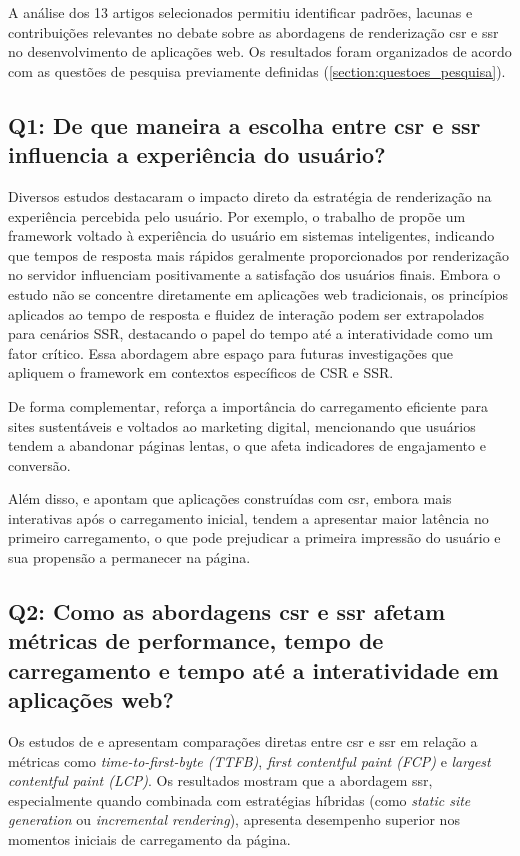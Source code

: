 A análise dos 13 artigos selecionados permitiu identificar padrões, lacunas e contribuições relevantes no debate sobre as abordagens de renderização \acrshort{csr} e \acrshort{ssr} no desenvolvimento de aplicações web. Os resultados foram organizados de acordo com as questões de pesquisa previamente definidas (\autoref{section:questoes_pesquisa}).

\subsection{Q1: De que maneira a escolha entre \acrshort{csr} e \acrshort{ssr} influencia a experiência do usuário?}

Diversos estudos destacaram o impacto direto da estratégia de renderização na experiência percebida pelo usuário. Por exemplo, o trabalho de \cite{Zhou2022} propõe um framework voltado à experiência do usuário em sistemas inteligentes, indicando que tempos de resposta mais rápidos geralmente proporcionados por renderização no servidor influenciam positivamente a satisfação dos usuários finais. Embora o estudo não se concentre diretamente em aplicações web tradicionais, os princípios aplicados ao tempo de resposta e fluidez de interação podem ser extrapolados para cenários SSR, destacando o papel do tempo até a interatividade como um fator crítico. Essa abordagem abre espaço para futuras investigações que apliquem o framework em contextos específicos de CSR e SSR.

De forma complementar, \cite{Lacom2022} reforça a importância do carregamento eficiente para sites sustentáveis e voltados ao marketing digital, mencionando que usuários tendem a abandonar páginas lentas, o que afeta indicadores de engajamento e conversão.

Além disso, \cite{Pokhriyal2024338} e \cite{Keshari20231571} apontam que aplicações construídas com \acrshort{csr}, embora mais interativas após o carregamento inicial, tendem a apresentar maior latência no primeiro carregamento, o que pode prejudicar a primeira impressão do usuário e sua propensão a permanecer na página.

\subsection{Q2: Como as abordagens \acrshort{csr} e \acrshort{ssr} afetam métricas de performance, tempo de carregamento e tempo até a interatividade em aplicações web?}

Os estudos de \cite{FadhilahIskandar2020} e \cite{Angkasa2023} apresentam comparações diretas entre \acrshort{csr} e \acrshort{ssr} em relação a métricas como \textit{time-to-first-byte (TTFB)}, \textit{first contentful paint (FCP)} e \textit{largest contentful paint (LCP)}. Os resultados mostram que a abordagem \acrshort{ssr}, especialmente quando combinada com estratégias híbridas (como \textit{static site generation} ou \textit{incremental rendering}), apresenta desempenho superior nos momentos iniciais de carregamento da página.

